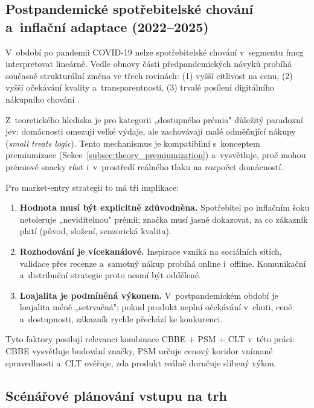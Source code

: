 \subsection{Postpandemické spotřebitelské chování a~inflační adaptace (2022--2025)}
\label{subsec:theory_postpandemic}

V~období po pandemii COVID-19 nelze spotřebitelské chování v~segmentu \gls{fmcg} interpretovat lineárně. Vedle obnovy části předpandemických návyků probíhá současně strukturální změna ve třech rovinách: (1) vyšší citlivost na cenu, (2) vyšší očekávání kvality a~transparentnosti, (3) trvalé posílení digitálního nákupního chování \parencite{eurostat_ecommerce_2025, czso_ict_2025, czso_inflace_2025}.

Z~teoretického hlediska je pro kategorii „dostupného prémia" důležitý paradoxní jev: domácnosti omezují velké výdaje, ale zachovávají malé odměňující nákupy (\emph{small treats logic}). Tento mechanismus je kompatibilní s~konceptem premiumizace (Sekce~\ref{subsec:theory_premiumization}) a~vysvětluje, proč mohou prémiové snacky růst i~v~prostředí reálného tlaku na rozpočet domácností.

Pro market-entry strategii to má tři implikace:
\begin{enumerate}
  \item \textbf{Hodnota musí být explicitně zdůvodněna.} Spotřebitel po inflačním šoku netoleruje „neviditelnou" prémii; značka musí jasně dokazovat, za co zákazník platí (původ, složení, senzorická kvalita).
  \item \textbf{Rozhodování je vícekanálové.} Inspirace vzniká na sociálních sítích, validace přes recenze a~samotný nákup probíhá online i~offline. Komunikační a~distribuční strategie proto nesmí být oddělené.
  \item \textbf{Loajalita je podmíněná výkonem.} V~postpandemickém období je loajalita méně „setrvačná"; pokud produkt neplní očekávání v~chuti, ceně a~dostupnosti, zákazník rychle přechází ke konkurenci.
\end{enumerate}

Tyto faktory posilují relevanci kombinace CBBE + PSM + CLT v~této práci: CBBE vysvětluje budování značky, PSM určuje cenový koridor vnímané spravedlnosti a~CLT ověřuje, zda produkt reálně doručuje slíbený výkon.

\subsection{Scénářové plánování vstupu na trh}
\label{subsec:theory_scenario_planning}

